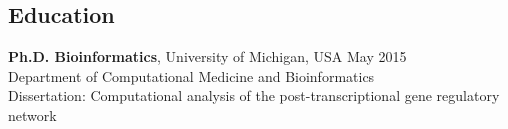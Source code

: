\documentclass[margin,line]{res}
\begin{document}
\begin{resume}




\section{\sc Education}
{\bf Ph.D. Bioinformatics}, University of Michigan, USA \hfill {May 2015}\\
Department of Computational Medicine and Bioinformatics\\ 
Dissertation: Computational analysis of the post-transcriptional gene regulatory network


\end{resume}
\end{document}
